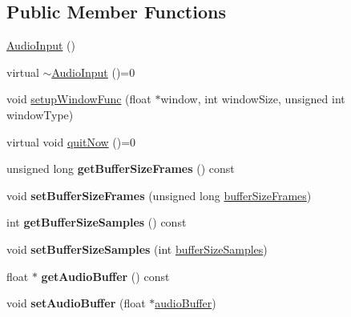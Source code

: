 \subsection*{Public Member Functions}
\begin{DoxyCompactItemize}
\item 
\hyperlink{classAudioInput_a51903411fbfb29b77f30a0ee3fbaa50e}{Audio\+Input} ()
\item 
virtual \hyperlink{classAudioInput_aaf278510da0fee4ccfd44c679067d96c}{$\sim$\+Audio\+Input} ()=0
\item 
void \hyperlink{classAudioInput_ad4485ea7937dd99442119dce52f7408d}{setup\+Window\+Func} (float $\ast$window, int window\+Size, unsigned int window\+Type)
\item 
virtual void \hyperlink{classAudioInput_a4fce5476455b1df813f1cb6eebb08311}{quit\+Now} ()=0
\item 
\hypertarget{classAudioInput_ae877bcc482868235b38fc7bb099d7a43}{}\label{classAudioInput_ae877bcc482868235b38fc7bb099d7a43} 
unsigned long {\bfseries get\+Buffer\+Size\+Frames} () const
\item 
\hypertarget{classAudioInput_a30068a991c436282680a320c043d021f}{}\label{classAudioInput_a30068a991c436282680a320c043d021f} 
void {\bfseries set\+Buffer\+Size\+Frames} (unsigned long \hyperlink{classAudioInput_adb734d274b7ce2967b74e2280ff6d487}{buffer\+Size\+Frames})
\item 
\hypertarget{classAudioInput_a9a6e1385e3bc495fca357ab684301daa}{}\label{classAudioInput_a9a6e1385e3bc495fca357ab684301daa} 
int {\bfseries get\+Buffer\+Size\+Samples} () const
\item 
\hypertarget{classAudioInput_a23e782296cc43ff127d9f95f77902b94}{}\label{classAudioInput_a23e782296cc43ff127d9f95f77902b94} 
void {\bfseries set\+Buffer\+Size\+Samples} (int \hyperlink{classAudioInput_a4e213a9a22a62dccc3a54369101559c7}{buffer\+Size\+Samples})
\item 
\hypertarget{classAudioInput_ac56e6ce779b652bd8fc343828a40fe76}{}\label{classAudioInput_ac56e6ce779b652bd8fc343828a40fe76} 
float $\ast$ {\bfseries get\+Audio\+Buffer} () const
\item 
\hypertarget{classAudioInput_a33e4d0a312cc8f3c26f0f06c9bee9fd8}{}\label{classAudioInput_a33e4d0a312cc8f3c26f0f06c9bee9fd8} 
void {\bfseries set\+Audio\+Buffer} (float $\ast$\hyperlink{classAudioInput_a797943485896a381ea80947c8b6a8488}{audio\+Buffer})
\item 
\hypertarget{classAudioInput_a407e9626c0ab056dd0d4401ce5056d00}{}\label{classAudioInput_a407e9626c0ab056dd0d4401ce5056d00} 

\end{DoxyCompactItemize}

